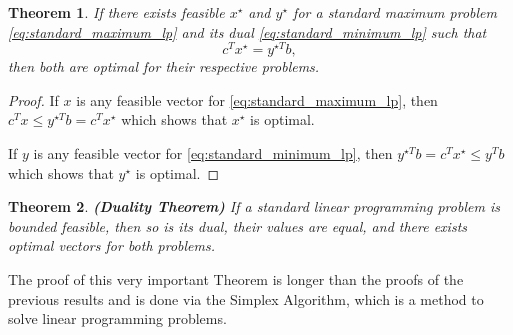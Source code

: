 \documentclass[a4paper,12pt]{article}
\newtheorem{Teo}{Theorem}
\begin{document}
\begin{Teo}If there exists feasible $x^{\star}$ and $y^{\star}$ for a standard maximum problem \eqref{eq:standard_maximum_lp} and its dual \eqref{eq:standard_minimum_lp} such that
\begin{equation}
c^Tx^{\star} = y^{\star T}b, 
\label{eq:optimality}
\end{equation}
then both are optimal for their respective problems.
\label{optimality}
\end{Teo}
\begin{proof}
If $x$ is any feasible vector for \eqref{eq:standard_maximum_lp}, then $c^Tx \leq y^{\star T}b = c^Tx^{\star}$ which shows that $x^\star$
is optimal.

If $y$ is any feasible vector for \eqref{eq:standard_minimum_lp}, then $ y^{\star T}b = c^Tx^{\star} \leq y^Tb$ which shows that $y^\star$
is optimal.
\end{proof}

\begin{Teo} \label{DualityTheorem} 
\textbf{(Duality Theorem)} If a standard linear programming problem is bounded feasible, then so is its dual, their values are equal, and there exists optimal vectors for both problems.
\end{Teo}

The proof of this very important Theorem is longer than the proofs of the previous results and is done via the Simplex Algorithm, which is a method to solve linear programming problems. 
\end{document}
